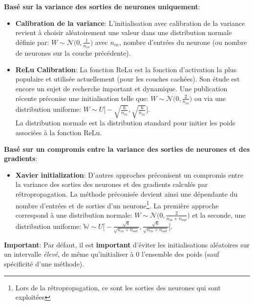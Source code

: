 \noindent \textbf{Basé sur la variance des sorties de neurones uniquement}:

\begin{itemize}
    \item \textbf{Calibration de la variance}: L'initialisation avec calibration de la variance revient à choisir aléatoirement une valeur dans une distribution normale définie par: $W\sim \mathcal{N}\big(0,\frac{1}{n_{in}}\big)$ avec $n_{in}$, nombre d'entrées du neurone (ou nombre de neurones sur la couche précédente).\\

    \item \textbf{ReLu Calibration}: La fonction ReLu est la fonction d'activation la plus populaire et utilisée actuellement (pour les couches cachées). Son étude est encore un sujet de recherche important et dynamique. Une publication récente \cite{relu_deep} préconise une initialisation telle que: $W\sim \mathcal{N}\big(0,\frac{2}{n_{in}}\big)$ ou via une distribution uniforme: $W\sim U\big[-\sqrt{\frac{6}{n_{in}}},\sqrt{\frac{6}{n_{in}}}\big]$.\\

    La distribution normale est la distribution standard pour initier les poids associées à la fonction ReLu.
\end{itemize}

\noindent \textbf{Basé sur un compromis entre la variance des sorties de neurones et des gradients}:

\begin{itemize}
    \item \textbf{Xavier initialization}: D'autres approches préconisent un compromis entre la variance des sorties des neurones et des gradients calculés par rétropropagation. La méthode préconisée devient ainsi une dépendante du nombre d'entrées et de sorties d'un neurone\footnote{Lors de la rétropropagation, ce sont les sorties des neurones qui sont exploitées}. La première approche correspond à une distribution normale: $W\sim \mathcal{N}\big(0,\frac{2}{n_{in}+n_{out}}\big)$ et la seconde, une distribution uniforme: $\mathbb{W}\sim U\big[-\frac{\sqrt{6}}{\sqrt{n_{in}+n_{out}}},\frac{\sqrt{6}}{\sqrt{n_{in}+n_{out}}}\big]$.
\end{itemize}

\noindent \textbf{Important}: Par défaut, il est \textbf{important} d'éviter les initialisations aléatoires sur un intervalle \textit{élevé}, de même qu'initialiser à 0 l'ensemble des poids (sauf spécificité d'une méthode).

